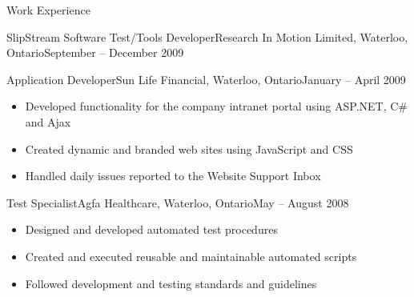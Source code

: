 \documentclass[11pt]{article}
\begin{document}
\begin{section}{Work Experience}
\begin{subsection}{SlipStream Software Test/Tools Developer}{Research In Motion Limited, Waterloo, Ontario}{September -- December 2009}
		\end{subsection}

		\begin{subsection}{Application Developer}{Sun Life Financial, Waterloo, Ontario}{January -- April 2009}

			\begin{itemize}
				\item Developed functionality for the company intranet portal using ASP.NET, C\# and Ajax
				\item Created dynamic and branded web sites using JavaScript and CSS
				\item Handled daily issues reported to the Website Support Inbox
			\end{itemize}

		\end{subsection}

		\begin{subsection}{Test Specialist}{Agfa Healthcare, Waterloo, Ontario}{May -- August 2008}

			\begin{itemize}
				\item Designed and developed automated test procedures
				\item Created and executed reusable and maintainable automated scripts
				\item Followed development and testing standards and guidelines
			\end{itemize}

		\end{subsection}

	\end{section}
\end{document}
